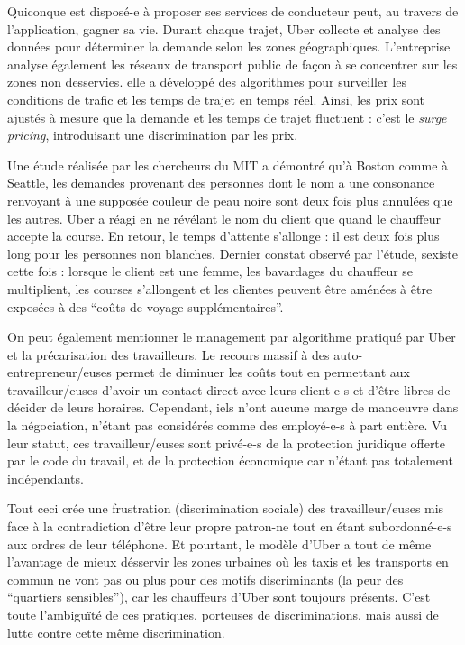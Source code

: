 \documentclass[a4paper,12pt]{report}
\begin{document}
Quiconque est disposé-e à proposer ses services de conducteur peut, au travers de l'application, gagner sa vie. Durant chaque trajet, Uber collecte et analyse des données pour déterminer la demande selon les zones géographiques. L'entreprise analyse également les réseaux de transport public de façon à se concentrer sur les zones non desservies. elle a développé des algorithmes pour surveiller les conditions de trafic et les temps de trajet en temps réel. Ainsi, les prix sont ajustés à mesure que la demande et les temps de trajet fluctuent : c'est le \textit{surge pricing}, introduisant une discrimination par les prix.

Une étude réalisée par les chercheurs du MIT a démontré qu'à Boston comme à Seattle, les demandes provenant des personnes dont le nom a une consonance renvoyant à une supposée couleur de peau noire sont deux fois plus annulées que les autres. Uber a réagi en ne révélant le nom du client que quand le chauffeur accepte la course. En retour, le temps d'attente s'allonge : il est deux fois plus long pour les personnes non blanches.
Dernier constat observé par l'étude, sexiste cette fois : lorsque le client est une femme, les bavardages du chauffeur se multiplient, les courses s'allongent et les clientes peuvent être aménées à être exposées à des ``coûts de voyage supplémentaires''.

On peut également mentionner le management par algorithme pratiqué par Uber et la précarisation des travailleurs. Le recours massif à des auto-entrepreneur/euses permet de diminuer les coûts tout en permettant aux travailleur/euses d'avoir un contact direct avec leurs client-e-s et d'être libres de décider de leurs horaires. Cependant, iels n'ont aucune marge de manoeuvre dans la négociation, n'étant pas considérés comme des employé-e-s à part entière. Vu leur statut, ces travailleur/euses sont privé-e-s de la protection juridique offerte par le code du travail, et de la protection économique car n'étant pas totalement indépendants.

Tout ceci crée une frustration (discrimination sociale) des travailleur/euses mis face à la contradiction d'être leur propre patron-ne tout en étant subordonné-e-s aux ordres de leur téléphone. Et pourtant, le modèle d'Uber a tout de même l'avantage de mieux désservir les zones urbaines où les taxis et les transports en commun ne vont pas ou plus pour des motifs discriminants (la peur des ``quartiers sensibles''), car les chauffeurs d'Uber sont toujours présents. C'est toute l'ambiguïté de ces pratiques, porteuses de discriminations, mais aussi de lutte contre cette même discrimination.
\end{document}
